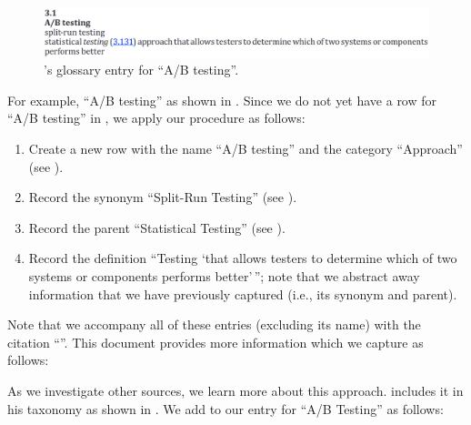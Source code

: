 \begin{figure}[bt!]
    \includegraphics[width=\linewidth]{assets/images/a-b testing.png}
    \caption{ \citet[p.~1]{IEEE2022}'s glossary entry for
        ``A/B testing''.}\label{fig:IEEE-A-B-Testing}
\end{figure}

For example, \citet[p.~1, 36]{IEEE2022}  ``A/B testing''
as shown in . Since we do not yet have a row for
``A/B testing'' in \ourApproachGlossary{}, we apply our procedure as follows:%
\begin{enumerate}
    \item Create a new row with the name ``A/B testing'' and the category
          ``Approach'' (see ).
    \item Record the synonym ``Split-Run Testing'' (see ).
    \item Record the parent ``Statistical Testing'' (see ).%
    \item Record the definition ``Testing `that allows testers to determine
          which of two systems or components performs better'\,''; note that
          we abstract away information that we have previously captured (i.e.,
          its synonym and parent).
\end{enumerate}
\ifnotpaper\newpage\noindent\fi
Note that we accompany all of these entries (excluding its name) with the
citation ``\citep[pp.~1, 36]{IEEE2022}''. This document provides more
information which we capture as follows:
As we investigate other sources, we learn more about this approach. \ifnotpaper
\else \citeauthor{Firesmith2015} \fi \citet[p.~58]{Firesmith2015} includes it
in his taxonomy as shown in . We add to our
entry for ``A/B Testing'' as follows:

